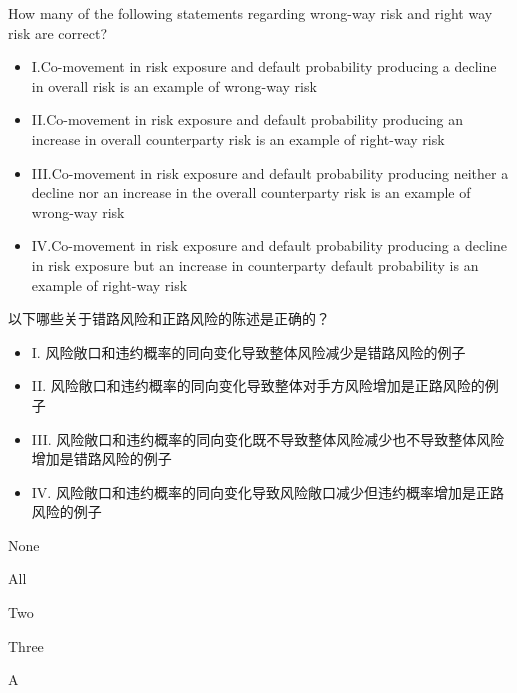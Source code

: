 \documentclass{article}
\newcounter{question} %
\begin{document}
\begin{question}
    How many of the following statements regarding wrong-way risk and right way risk are correct?
    \begin{itemize}
        \item I.Co-movement in risk exposure and default probability producing a decline in overall risk is an example of wrong-way risk
        \item II.Co-movement in risk exposure and default probability producing an increase in overall counterparty risk is an example of right-way risk
        \item III.Co-movement in risk exposure and default probability producing neither a decline nor an increase in the overall counterparty risk is an example of wrong-way risk
        \item IV.Co-movement in risk exposure and default probability producing a decline in risk exposure but an increase in counterparty default probability is an example of right-way risk
    \end{itemize}
    以下哪些关于错路风险和正路风险的陈述是正确的？
    \begin{itemize}
        \item I. 风险敞口和违约概率的同向变化导致整体风险减少是错路风险的例子
        \item II. 风险敞口和违约概率的同向变化导致整体对手方风险增加是正路风险的例子
        \item III. 风险敞口和违约概率的同向变化既不导致整体风险减少也不导致整体风险增加是错路风险的例子
        \item IV. 风险敞口和违约概率的同向变化导致风险敞口减少但违约概率增加是正路风险的例子
    \end{itemize}
\end{question}

\begin{choices}
    \item None
    \item All
    \item Two
    \item Three
\end{choices}

\begin{correctanswer}
    A
\end{correctanswer}
\end{document}
